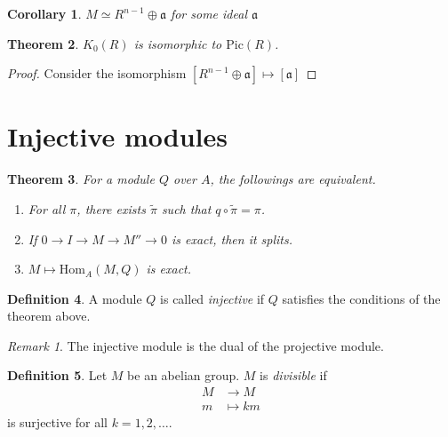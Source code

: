\documentclass[12pt]{article}
\theoremstyle{plain}
\newtheorem{theorem}{Theorem}[section]
\newtheorem{corollary}[theorem]{Corollary}
\theoremstyle{remark}
\newtheorem*{remark}{Remark}
\theoremstyle{definition}
\newtheorem{definition}[theorem]{Definition}
\newcommand{\Hom}[3]{\mathrm{Hom}_{#3}(#1,#2)}
\begin{document}
\begin{corollary}
    $M\simeq R^{n-1}\oplus \mathfrak{a}$ for some ideal $\mathfrak{a}$
\end{corollary}

\begin{theorem}
    $K_0(R)$ is isomorphic to $\mathrm{Pic}(R)$.
\end{theorem}
\begin{proof}
    Consider the isomorphism $[R^{n-1}\oplus\mathfrak{a}]\mapsto [\mathfrak{a}]$
\end{proof}



\clearpage
\section{Injective modules}

\begin{theorem}
    For a module $Q$ over $A$, the followings are equivalent.
    \begin{enumerate}
        \item For all $\pi$, there exists $\tilde{\pi}$ such that $q\circ \tilde{\pi} = \pi$.
        \begin{figure}[H]
            \centering
        \end{figure}
        \item If $0\rightarrow I\rightarrow M\rightarrow M''\rightarrow 0$ is exact, then it splits.
        \item $M\mapsto \Hom{M}{Q}{A}$ is exact.
    \end{enumerate}
\end{theorem}


\begin{definition}
    A module $Q$ is called \emph{injective} if $Q$ satisfies the conditions of the theorem above.
\end{definition}
\begin{remark}
    The injective module is the dual of the projective module.
\end{remark}

\begin{definition}
    Let $M$ be an abelian group. $M$ is \emph{divisible} if
    \begin{align*}
        M &\rightarrow M \\
        m &\mapsto km
    \end{align*}
    is surjective for all $k=1,2,\dots$.
\end{definition}
\end{document}
